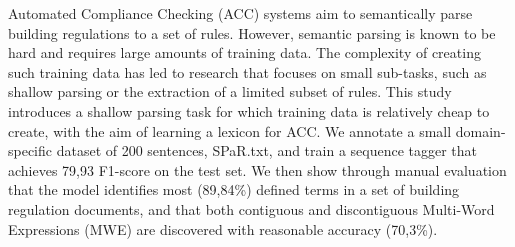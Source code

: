 Automated Compliance Checking (ACC) systems aim to semantically parse building regulations to a set of rules. However, semantic parsing is known to be hard and requires large amounts of training data. The complexity of creating such training data has led to research that focuses on small sub-tasks, such as shallow parsing or the extraction of a limited subset of rules. This study introduces a shallow parsing task for which training data is relatively cheap to create, with the aim of learning a lexicon for ACC. We annotate a small domain-specific dataset of 200 sentences, SPaR.txt, and train a sequence tagger that achieves 79,93 F1-score on the test set. We then show through manual evaluation that the model identifies most (89,84\%) defined terms in a set of building regulation documents, and that both contiguous and discontiguous Multi-Word Expressions (MWE) are discovered with reasonable accuracy (70,3\%).
